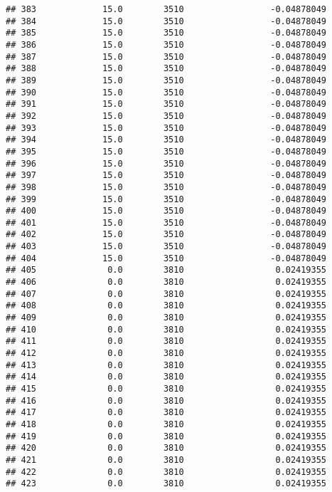 \documentclass[]{article}
\begin{document}
\begin{verbatim}
## 383             15.0        3510                 -0.04878049
## 384             15.0        3510                 -0.04878049
## 385             15.0        3510                 -0.04878049
## 386             15.0        3510                 -0.04878049
## 387             15.0        3510                 -0.04878049
## 388             15.0        3510                 -0.04878049
## 389             15.0        3510                 -0.04878049
## 390             15.0        3510                 -0.04878049
## 391             15.0        3510                 -0.04878049
## 392             15.0        3510                 -0.04878049
## 393             15.0        3510                 -0.04878049
## 394             15.0        3510                 -0.04878049
## 395             15.0        3510                 -0.04878049
## 396             15.0        3510                 -0.04878049
## 397             15.0        3510                 -0.04878049
## 398             15.0        3510                 -0.04878049
## 399             15.0        3510                 -0.04878049
## 400             15.0        3510                 -0.04878049
## 401             15.0        3510                 -0.04878049
## 402             15.0        3510                 -0.04878049
## 403             15.0        3510                 -0.04878049
## 404             15.0        3510                 -0.04878049
## 405              0.0        3810                  0.02419355
## 406              0.0        3810                  0.02419355
## 407              0.0        3810                  0.02419355
## 408              0.0        3810                  0.02419355
## 409              0.0        3810                  0.02419355
## 410              0.0        3810                  0.02419355
## 411              0.0        3810                  0.02419355
## 412              0.0        3810                  0.02419355
## 413              0.0        3810                  0.02419355
## 414              0.0        3810                  0.02419355
## 415              0.0        3810                  0.02419355
## 416              0.0        3810                  0.02419355
## 417              0.0        3810                  0.02419355
## 418              0.0        3810                  0.02419355
## 419              0.0        3810                  0.02419355
## 420              0.0        3810                  0.02419355
## 421              0.0        3810                  0.02419355
## 422              0.0        3810                  0.02419355
## 423              0.0        3810                  0.02419355

\end{verbatim}
\end{document}
